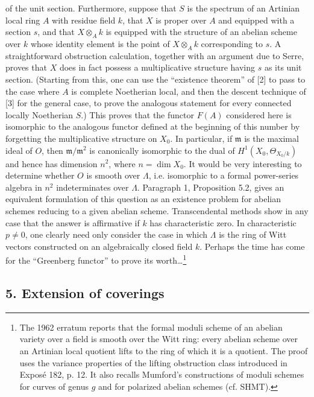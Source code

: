 of the unit section. Furthermore, suppose that $S$ is the spectrum of an
Artinian local ring $A$ with residue field $k$, that $X$ is proper over $A$ and
equipped with a section $s$, and that $X\otimes_Ak$ is equipped with the
structure of an abelian scheme over $k$ whose identity element is the point of
$X\otimes_Ak$ corresponding to $s$. A straightforward obstruction calculation,
together with an argument due to Serre, proves that $X$ does in fact possess a
multiplicative structure having $s$ as its unit section. (Starting from this,
one can use the “existence theorem” of [2] to pass to the case where $A$ is
complete Noetherian local, and then the descent technique of [3] for the
general case, to prove the analogous statement for every connected locally
Noetherian $S$.) This proves that the functor $F(A)$ considered here is
isomorphic to the analogous functor defined at the beginning of this number by
forgetting the multiplicative structure on $X_0$. In particular, if
$\mathfrak m$ is the maximal ideal of $O$, then $\mathfrak m/\mathfrak m^2$ is
canonically isomorphic to the dual of $H^1(X_0,\Theta_{X_0/k})$ and hence has
dimension $n^2$, where $n=\dim X_0$. It would be very interesting to determine
whether $O$ is smooth over $\Lambda$, i.e. isomorphic to a formal power-series
algebra in $n^2$ indeterminates over $\Lambda$. Paragraph 1, Proposition 5.2,
gives an equivalent formulation of this question as an existence problem for
abelian schemes reducing to a given abelian scheme. Transcendental methods show
in any case that the answer is affirmative if $k$ has characteristic zero. In
characteristic $p\ne0$, one clearly need only consider the case in which
$\Lambda$ is the ring of Witt vectors constructed on an algebraically closed
field $k$. Perhaps the time has come for the “Greenberg functor” to prove its
worth\ldots\footnote{The 1962 erratum reports that the formal moduli scheme of
an abelian variety over a field is smooth over the Witt ring: every abelian
scheme over an Artinian local quotient lifts to the ring of which it is a
quotient. The proof uses the variance properties of the lifting obstruction
class introduced in Exposé 182, p. 12. It also recalls Mumford's constructions
of moduli schemes for curves of genus $g$ and for polarized abelian schemes
(cf. SHMT).}

\subsection*{5. Extension of coverings}

